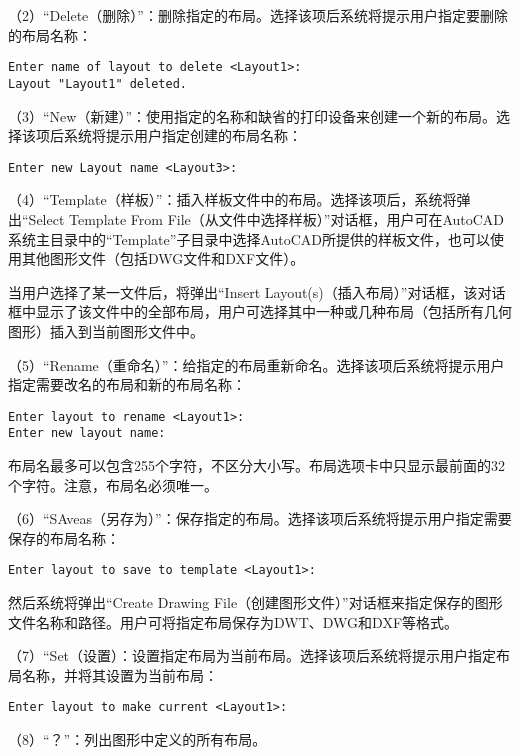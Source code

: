 （2）“Delete（删除）”：删除指定的布局。选择该项后系统将提示用户指定要删除的布局名称：

\begin{verbatim}
Enter name of layout to delete <Layout1>:
Layout "Layout1" deleted.
\end{verbatim}


（3）“New（新建）”：使用指定的名称和缺省的打印设备来创建一个新的布局。选择该项后系统将提示用户指定创建的布局名称： 

\begin{verbatim}
Enter new Layout name <Layout3>:
\end{verbatim}

（4）“Template（样板）”：插入样板文件中的布局。选择该项后，系统将弹出“Select Template From File（从文件中选择样板）”对话框，用户可在AutoCAD系统主目录中的“Template”子目录中选择AutoCAD所提供的样板文件，也可以使用其他图形文件（包括DWG文件和DXF文件）。

当用户选择了某一文件后，将弹出“Insert Layout(s)（插入布局）”对话框，该对话框中显示了该文件中的全部布局，用户可选择其中一种或几种布局（包括所有几何图形）插入到当前图形文件中。


（5）“Rename（重命名）”：给指定的布局重新命名。选择该项后系统将提示用户指定需要改名的布局和新的布局名称：

\begin{verbatim}
Enter layout to rename <Layout1>:
Enter new layout name:
\end{verbatim}

布局名最多可以包含255个字符，不区分大小写。布局选项卡中只显示最前面的32个字符。注意，布局名必须唯一。

（6）“SAveas（另存为）”：保存指定的布局。选择该项后系统将提示用户指定需要保存的布局名称：

\begin{verbatim}
Enter layout to save to template <Layout1>:
\end{verbatim}

然后系统将弹出“Create Drawing File（创建图形文件）”对话框来指定保存的图形文件名称和路径。用户可将指定布局保存为DWT、DWG和DXF等格式。


（7）“Set（设置）：设置指定布局为当前布局。选择该项后系统将提示用户指定布局名称，并将其设置为当前布局：

\begin{verbatim}
Enter layout to make current <Layout1>:
\end{verbatim}

（8）“？”：列出图形中定义的所有布局。


